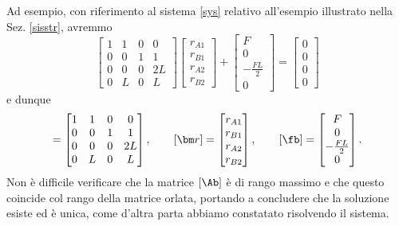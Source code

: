 Ad esempio, con riferimento al sistema \eqref{sys} relativo all'esempio illustrato nella Sez. \ref{sisstr}, avremmo
%
\begin{equation}
	\begin{bmatrix}
		1 & 1 & 0 & 0  \\
		0 & 0 & 1 & 1  \\
		0 & 0 & 0 & 2L  \\
		0 & L & 0 & L 
	\end{bmatrix}
	\begin{bmatrix}
		r_{A1} \\
		r_{B1} \\
		r_{A2} \\
		r_{B2} 
	\end{bmatrix}+
	\begin{bmatrix}
		F\\
		0 \\
	-\frac{FL}{2} \\
	0
	\end{bmatrix}
	=
	\begin{bmatrix}
		0 \\
		0 \\
		0 \\
		0
	\end{bmatrix}
\end{equation}
e dunque
\begin{equation}
	[\Ab]=\begin{bmatrix}
		1 & 1 & 0 & 0  \\
		0 & 0 & 1 & 1  \\
		0 & 0 & 0 & 2L  \\
		0 & L & 0 & L 
	\end{bmatrix}, \qquad
	[{\bm r}]=\begin{bmatrix}
		r_{A1} \\
		r_{B1} \\
		r_{A2} \\
		r_{B2} 
	\end{bmatrix}, \qquad 
	[\fb]=\begin{bmatrix}
	F\\
	0 \\
	-\frac{FL}{2} \\
	0
	\end{bmatrix}.
\end{equation}
Non è difficile verificare che la matrice $	[\Ab]$ è di rango massimo e che questo coincide col rango della matrice orlata, portando a concludere che la soluzione esiste ed è unica, come d'altra parta abbiamo constatato risolvendo il sistema.

